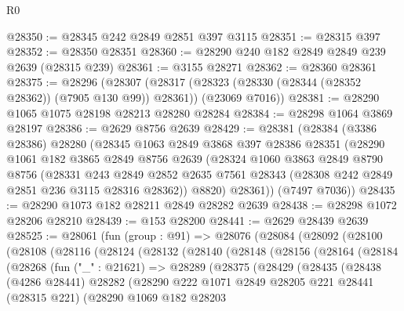 \begin{lexlean}{R0}
\begin{coremodule}
@28350 := @28345 @242 @2849 @2851 @397 @3115
@28351 := @28315 @397
@28352 := @28350 @28351
@28360 := @28290 @240 @182 @2849 @2849 @239 @2639 (@28315 @239)
@28361 := @3155 @28271
@28362 := @28360 @28361
@28375 := @28296
    (@28307
      (@28317 (@28323 (@28330 (@28344 (@28352 @28362)) (@7905 @130 @99)) @28361))
      (@23069 @7016))
@28381 := @28290 @1065 @1075 @28198 @28213 @28280 @28284
@28384 := @28298 @1064 @3869 @28197
@28386 := @2629 @8756 @2639
@28429 := @28381
    (@28384
      (@3386 @28386)
      @28280
      (@28345
        @1063
        @2849
        @3868
        @397
        @28386
        @28351
        (@28290
          @1061
          @182
          @3865
          @2849
          @8756
          @2639
          (@28324
            @1060
            @3863
            @2849
            @8790
            @8756
            (@28331
              @243
              @2849
              @2852
              @2635
              @7561
              @28343
              (@28308 @242 @2849 @2851 @236 @3115 @28316 @28362))
            @8820)
          @28361))
      (@7497 @7036))
@28435 := @28290 @1073 @182 @28211 @2849 @28282 @2639
@28438 := @28298 @1072 @28206 @28210
@28439 := @153 @28200
@28441 := @2629 @28439 @2639
@28525 := @28061
    (fun (group : @91) =>
    @28076
      (@28084
        (@28092
          (@28100
            (@28108
              (@28116
                (@28124
                  (@28132
                    (@28140
                      (@28148
                        (@28156
                          (@28164
                            (@28184
                              (@28268
                                (fun ("_" : @21621) =>
                                @28289
                                  (@28375
                                    (@28429
                                      (@28435
                                        (@28438
                                          (@4286 @28441)
                                          @28282
                                          (@28290
                                            @222
                                            @1071
                                            @2849
                                            @28205
                                            @221
                                            @28441
                                            (@28315 @221)
                                            (@28290
                                              @1069
                                              @182
                                              @28203

\end{coremodule}
\end{lexlean}
